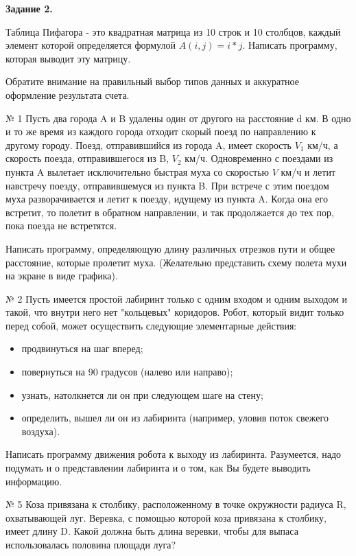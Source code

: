 {\bf Задание 2.}

Таблица Пифагора - это квадратная матрица из 10 строк и 10 столбцов, каждый элемент которой определяется формулой $A(i, j) = i*j.$ Написать программу, которая выводит эту матрицу.














Обратите внимание на правильный выбор типов данных и аккуратное оформление результата счета.

№ 1 Пусть два города A и B удалены один от другого на расстояние d км. В одно и то же время из каждого города отходит скорый поезд по направлению к другому городу. Поезд, отправившийся из города A, имеет скорость $V_1$ км/ч, 
а скорость поезда, отправившегося из B, $V_2$ км/ч. Одновременно с поездами из пункта A вылетает исключительно быстрая муха со скоростью $V$ км/ч и летит навстречу поезду, отправившемуся из пункта B. 
При встрече с этим поездом муха разворачивается и летит к поезду, идущему из пункта A. Когда она его встретит, то полетит в обратном направлении, и так продолжается до тех пор, пока поезда не встретятся.

Написать программу, определяющую длину различных отрез­ков пути и общее расстояние, которые пролетит муха. (Желательно представить схему полета мухи на экране в виде графика).

№ 2 Пусть имеется простой лабиринт только с одним входом и одним выходом и такой, что внутри него нет "кольцевых" коридоров. Робот, который видит только перед собой, может осуще­ствить следующие элементарные действия:
\begin{itemize}
	\item продвинуться на шаг вперед;
	\item повернуться на 90 градусов (налево или направо);
	\item узнать, натолкнется ли он при следующем шаге на стену;
	\item определить, вышел ли он из лабиринта (например, уловив поток свежего воздуха).
\end{itemize}

Написать программу движения робота к выходу из лабиринта. Разумеется, надо подумать и о представлении лабиринта и о том, как Вы будете выводить информацию.


№ 5 Коза привязана к столбику, расположенному в точке окружности радиуса R, охватывающей луг. Веревка, с помощью которой коза привязана к столбику, имеет длину D. Какой должна быть длина веревки, чтобы для выпаса использовалась половина площади луга?

